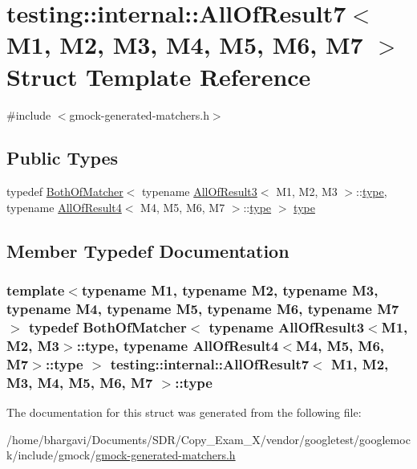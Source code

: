 \hypertarget{structtesting_1_1internal_1_1_all_of_result7}{}\section{testing\+:\+:internal\+:\+:All\+Of\+Result7$<$ M1, M2, M3, M4, M5, M6, M7 $>$ Struct Template Reference}
\label{structtesting_1_1internal_1_1_all_of_result7}


{\ttfamily \#include $<$gmock-\/generated-\/matchers.\+h$>$}

\subsection*{Public Types}
\begin{DoxyCompactItemize}
\item 
typedef \hyperlink{classtesting_1_1internal_1_1_both_of_matcher}{Both\+Of\+Matcher}$<$ typename \hyperlink{structtesting_1_1internal_1_1_all_of_result3}{All\+Of\+Result3}$<$ M1, M2, M3 $>$\+::\hyperlink{structtesting_1_1internal_1_1_all_of_result7_a47ab0d670258434b0e65530591948e8c}{type}, typename \hyperlink{structtesting_1_1internal_1_1_all_of_result4}{All\+Of\+Result4}$<$ M4, M5, M6, M7 $>$\+::\hyperlink{structtesting_1_1internal_1_1_all_of_result7_a47ab0d670258434b0e65530591948e8c}{type} $>$ \hyperlink{structtesting_1_1internal_1_1_all_of_result7_a47ab0d670258434b0e65530591948e8c}{type}
\end{DoxyCompactItemize}


\subsection{Member Typedef Documentation}
\subsubsection[{\texorpdfstring{type}{type}}]{\setlength{\rightskip}{0pt plus 5cm}template$<$typename M1, typename M2, typename M3, typename M4, typename M5, typename M6, typename M7$>$ typedef {\bf Both\+Of\+Matcher}$<$ typename {\bf All\+Of\+Result3}$<$M1, M2, M3$>$\+::{\bf type}, typename {\bf All\+Of\+Result4}$<$M4, M5, M6, M7$>$\+::{\bf type} $>$ {\bf testing\+::internal\+::\+All\+Of\+Result7}$<$ M1, M2, M3, M4, M5, M6, M7 $>$\+::{\bf type}}\hypertarget{structtesting_1_1internal_1_1_all_of_result7_a47ab0d670258434b0e65530591948e8c}{}\label{structtesting_1_1internal_1_1_all_of_result7_a47ab0d670258434b0e65530591948e8c}


The documentation for this struct was generated from the following file\+:\begin{DoxyCompactItemize}
\item 
/home/bhargavi/\+Documents/\+S\+D\+R/\+Copy\+\_\+\+Exam\+\_\+X/vendor/googletest/googlemock/include/gmock/\hyperlink{gmock-generated-matchers_8h}{gmock-\/generated-\/matchers.\+h}\end{DoxyCompactItemize}
